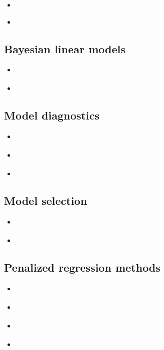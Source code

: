 \documentclass{report}
\begin{document}
\begin{itemize}
    \item \cite[Chapter~3.6]{faraway_linear_2015}
    \item \cite[Chapter~2.7]{wakefield_bayesian_2013}
\end{itemize}

\subsection{Bayesian linear models}

\begin{itemize}
    \item \cite[Chapter~3]{wakefield_bayesian_2013}
    \item \cite[Chapter~10.2]{agresti_foundations_2015}
\end{itemize}

\subsection{Model diagnostics}

\begin{itemize}
    \item \cite[Chapter~6]{faraway_linear_2015}
    \item \cite[Chapter~5.11]{wakefield_bayesian_2013}
    \item \cite[Chapter~2.5]{agresti_foundations_2015}
\end{itemize}

\subsection{Model selection}

\begin{itemize}
    \item \cite[Chapter~10]{faraway_linear_2015}
    \item \cite[Chapter~4.8]{wakefield_bayesian_2013}
\end{itemize}

\subsection{Penalized regression methods}

\begin{itemize}
    \item \cite[Chapter~11]{faraway_linear_2015}
    \item \cite[Chapter~10.5]{wakefield_bayesian_2013}
    \item \cite[Chapter~3.4]{hastie_elements_2009}
    \item \cite[Chapter~11.1]{agresti_foundations_2015}
\end{itemize}
\end{document}
